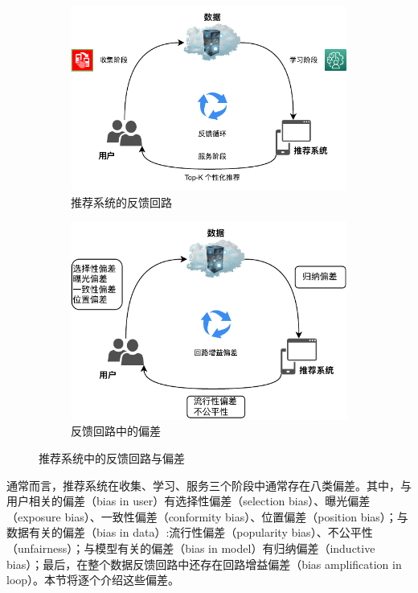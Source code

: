\begin{figure}[!h]
    \centering
    \begin{subfigure}{0.49\linewidth}
        \centering
        \includegraphics[width=.88\linewidth]{figure/rs-loops.drawio.pdf}
        \caption{推荐系统的反馈回路}
        \label{fig:rs-loop}
    \end{subfigure}
    \begin{subfigure}{0.49\linewidth}
        \centering
        \includegraphics[width=.88\linewidth]{figure/rs-bias.drawio.pdf}
        \caption{反馈回路中的偏差}
        \label{fig:rs-bias}
    \end{subfigure}
    \caption{推荐系统中的反馈回路与偏差}
    \label{fig:rs-loop-bias}
\end{figure}

通常而言，推荐系统在收集、学习、服务三个阶段中通常存在八类偏差\cite{chen_bias_2021}。其中，与用户相关的偏差（bias in user）有选择性偏差（selection bias）、曝光偏差（exposure bias）、一致性偏差（conformity bias）、位置偏差（position bias）；与数据有关的偏差（bias in data）:流行性偏差（popularity bias）、不公平性（unfairness）；与模型有关的偏差（bias in model）有归纳偏差（inductive bias）；最后，在整个数据反馈回路中还存在回路增益偏差（bias amplification in loop）。本节将逐个介绍这些偏差。


